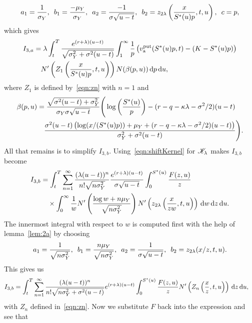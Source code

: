 		$$
			a_1 = \frac{1}{\sigma_Y}, \enskip b_1 = \frac{-\mu_Y}{\sigma_Y}, \enskip a_2 = \frac{-1}{\sigma\sqrt{u-t}}, \enskip
			b_2 = z_{2\lambda}\left( \frac{x}{S^*(u)p}, t, u \right), \enskip c = p,
		$$
		which gives
		\begin{align*}
			 I_{3,a} &=  \lambda  \int_t^T \frac{e^{(r+\lambda)(u-t)}}{\sqrt{\sigma_Y^2 + \sigma^2(u-t)}} \int_1^\infty \frac{1}{p} \left( v_{\text{a}}^{\text{put}}(S^*(u)p,t) - (K-S^*(u)p) \right)  \\
			&\quad {} N'\left( Z_1 \left( \frac{x}{S^*(u)p}, t, u \right)\right)N(\beta(p,u)) \, \mathrm d p \, \mathrm d u,
		\end{align*}	
		where $Z_1$ is defined by~\eqref{eqn:zn} with $n=1$ and
		\begin{equation}
			\label{eqn:betaA}
			\begin{split}
			\beta(p,u) &= \frac{\sqrt{\sigma^2(u-t) + \sigma_Y^2}}{\sigma_Y\sigma\sqrt{u-t}}\Bigg( \log\left(\frac{S^*(u)}{p}\right) - (r-q-\kappa\lambda-\sigma^2/2)(u-t) \\
			&\quad {} \frac{\sigma^2(u-t)\left( \log(x/(S^*(u)p)) + \mu_Y + (r-q-\kappa\lambda - \sigma^2/2)(u-t) \right)}{\sigma_Y^2 + \sigma^2(u-t)} \Bigg).
			\end{split}
		\end{equation}
		All that remains is to simplify $I_{3,b}$. Using~\eqref{eqn:shiftKernel} for $\mathscr K_\lambda$ makes $I_{3,b}$ become
		\begin{align*}
			I_{3,b} &= \int_t^T \displaystyle\sum\limits_{n=1}^{\infty} \frac{(\lambda(u-t))^n}{n!\sqrt{n\sigma_Y^2}}\frac{e^{(r+\lambda)(u-t)}}{\sigma\sqrt{u-t}} \int_0^{S^*(u)} \frac{F(z,u)}{z}  \\
			&\quad {} \times \int_0^\infty  \frac{1}{w}N'\left( \frac{\log w + n\mu_Y}{\sqrt{n\sigma_Y^2}} \right)N'\left( z_{2\lambda}\left( \frac{x}{zw},t,u \right) \right) \, \mathrm d w \, \mathrm d z \, \mathrm d u.
		\end{align*}
		The innermost integral with respect to $w$ is computed first with the help of lemma~\ref{lem:2a} by choosing
		$$
			a_1 = \frac{1}{\sqrt{n\sigma_Y^2}}, \enskip b_1 = \frac{n\mu_Y}{\sqrt{n\sigma_Y^2}}, \enskip a_2 = \frac{1}{\sigma\sqrt{u-t}}, \enskip b_2 = z_{2\lambda}(x/z,t,u).
		$$
		This gives us
		\begin{align*}
			I_{3,b} &= \int_t^T \displaystyle\sum\limits_{n=1}^{\infty} \frac{(\lambda(u-t))^n}{n!\sqrt{n\sigma_Y^2 + \sigma^2(u-t)}}e^{(r+\lambda)(u-t)}\int_0^{S^*(u)} \frac{F(z,u)}{z}  N'\left( Z_n\left( \frac{x}{z},t, u \right) \right)  \, \mathrm d z \, \mathrm d u,
		\end{align*}
		with $Z_n$ defined in~\eqref{eqn:zn}. Now we substitute $F$ back into the expression and see that
